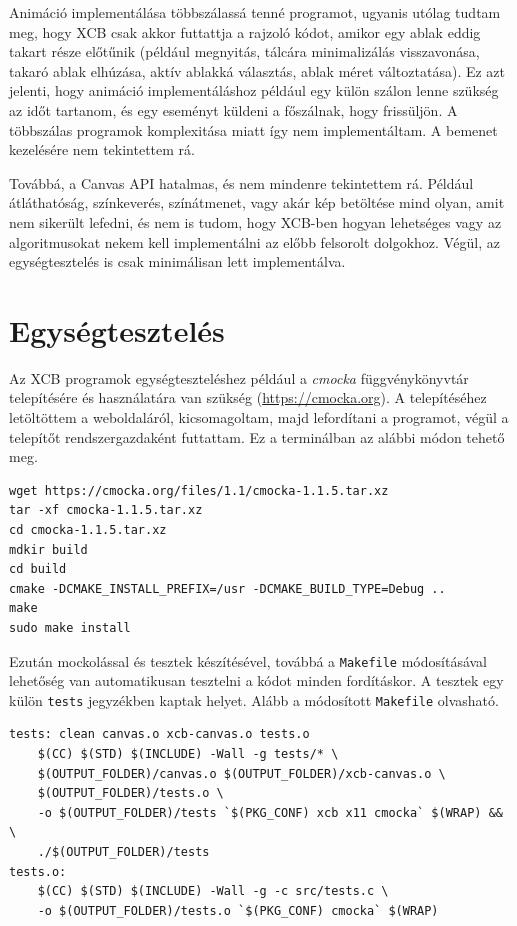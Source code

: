 Animáció implementálása többszálassá tenné programot, ugyanis utólag tudtam meg, hogy XCB csak akkor futtattja a rajzoló kódot, amikor egy ablak eddig takart része előtűnik (például megnyitás, tálcára minimalizálás visszavonása, takaró ablak elhúzása, aktív ablakká választás, ablak méret változtatása). Ez azt jelenti, hogy animáció implementáláshoz például egy külön szálon lenne szükség az időt tartanom, és egy eseményt küldeni a főszálnak, hogy frissüljön. A többszálas programok komplexitása miatt így nem implementáltam. A bemenet kezelésére nem tekintettem rá.

Továbbá, a Canvas API hatalmas, és nem mindenre tekintettem rá. Például átláthatóság, színkeverés, színátmenet, vagy akár kép betöltése mind olyan, amit nem sikerült lefedni, és nem is tudom, hogy XCB-ben hogyan lehetséges vagy az algoritmusokat nekem kell implementálni az előbb felsorolt dolgokhoz. Végül, az egységtesztelés is csak minimálisan lett implementálva.

\section{Egységtesztelés} \label{sec:cmocka-install}

Az XCB programok egységteszteléshez például a \textit{cmocka} függvénykönyvtár telepítésére és használatára van szükség (\url{https://cmocka.org}). A telepítéséhez letöltöttem a weboldaláról, kicsomagoltam, majd lefordítani a programot, végül a telepítőt rendszergazdaként futtattam. Ez a terminálban az alábbi módon tehető meg.

\begin{verbatim}
wget https://cmocka.org/files/1.1/cmocka-1.1.5.tar.xz
tar -xf cmocka-1.1.5.tar.xz
cd cmocka-1.1.5.tar.xz
mdkir build
cd build
cmake -DCMAKE_INSTALL_PREFIX=/usr -DCMAKE_BUILD_TYPE=Debug ..
make
sudo make install
\end{verbatim}

Ezután mockolással és tesztek készítésével, továbbá a \texttt{Makefile} módosításával lehetőség van automatikusan tesztelni a kódot minden fordításkor. A tesztek egy külön \texttt{tests} jegyzékben kaptak helyet. Alább a módosított \texttt{Makefile} olvasható.

\begin{verbatim}
tests: clean canvas.o xcb-canvas.o tests.o
	$(CC) $(STD) $(INCLUDE) -Wall -g tests/* \
	$(OUTPUT_FOLDER)/canvas.o $(OUTPUT_FOLDER)/xcb-canvas.o \
	$(OUTPUT_FOLDER)/tests.o \
	-o $(OUTPUT_FOLDER)/tests `$(PKG_CONF) xcb x11 cmocka` $(WRAP) && \
	./$(OUTPUT_FOLDER)/tests
tests.o:
	$(CC) $(STD) $(INCLUDE) -Wall -g -c src/tests.c \
	-o $(OUTPUT_FOLDER)/tests.o `$(PKG_CONF) cmocka` $(WRAP)
\end{verbatim}


